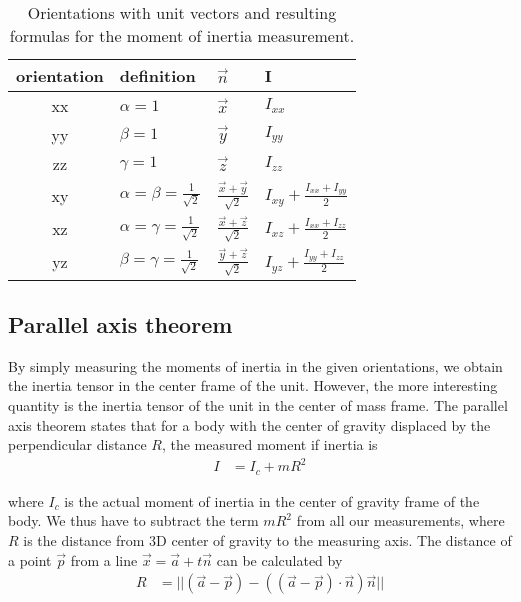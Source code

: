 \documentclass[journal]{IEEEtran}
\begin{document}
\begin{table}
	\centering
	\begin{tabular}{c | l l l}
		orientation	& definition	& $\vec{n}$	& I \\
		\hline
		xx & $\alpha = 1$							& $\vec{x}$								& $I_{xx}$ \\
		yy & $\beta = 1$							& $\vec{y}$								& $I_{yy}$ \\
		zz & $\gamma = 1$							& $\vec{z}$								& $I_{zz}$ \\
		xy & $\alpha = \beta = \frac{1}{\sqrt2}$	& $\frac{\vec{x} + \vec{y}}{\sqrt{2}}$	& $I_{xy} + \frac{I_{xx} + I_{yy}}{2}$ \\
		xz & $\alpha = \gamma = \frac{1}{\sqrt2}$	& $\frac{\vec{x} + \vec{z}}{\sqrt{2}}$	& $I_{xz} + \frac{I_{xx} + I_{zz}}{2}$ \\
		yz & $\beta = \gamma = \frac{1}{\sqrt2}$	& $\frac{\vec{y} + \vec{z}}{\sqrt{2}}$	& $I_{yz} + \frac{I_{yy} + I_{zz}}{2}$ \\
	\end{tabular}
	\caption{Orientations with unit vectors and resulting formulas for the moment of inertia measurement.}
	\label{tab:InertiaAxes}
\end{table}

\subsection{Parallel axis theorem}

By simply measuring the moments of inertia in the given orientations, we obtain the inertia tensor in the center frame of the unit.
However, the more interesting quantity is the inertia tensor of the unit in the center of mass frame.
The parallel axis theorem states that for a body with the center of gravity displaced by the perpendicular distance $R$, the measured moment if inertia is
\begin{align}
	I & = I_c + m R^2
\end{align}

where $I_c$ is the actual moment of inertia in the center of gravity frame of the body.
We thus have to subtract the term $m R^2$ from all our measurements, where $R$ is the distance from 3D center of gravity to the measuring axis.
The distance of a point $\vec{p}$ from a line $\vec{x} = \vec{a} + t \vec{n}$ can be calculated by
\begin{align}
	R & = || (\vec{a} - \vec{p}) - ( (\vec{a} - \vec{p}) \cdot \vec{n}) \vec{n} ||
\end{align}
\end{document}
